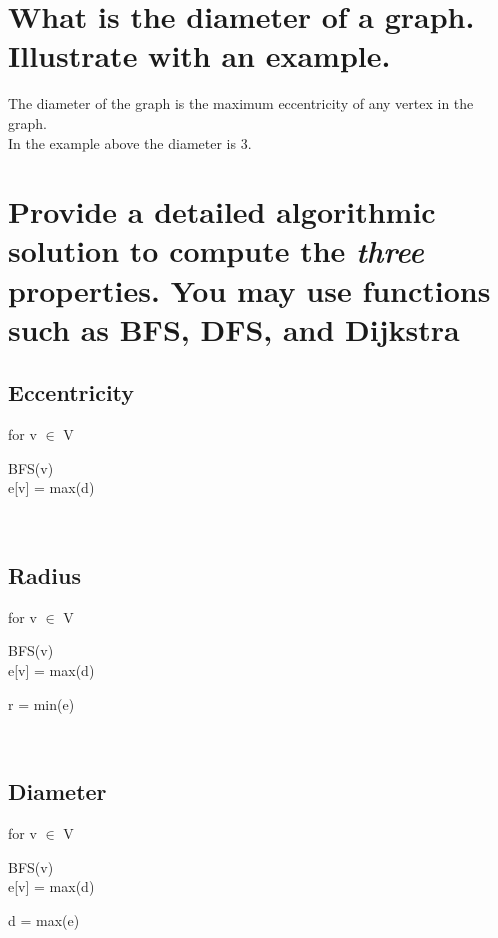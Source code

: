 \documentclass[titlepage]{article}
\begin{document}
  \section{What is the diameter of a graph. Illustrate with an example.}

    The diameter of the graph is the maximum eccentricity of any vertex in the graph.\\
    In the example above the diameter is 3.

  \section{Provide a detailed algorithmic solution to compute the \emph{three} properties. You may use functions such as BFS, DFS, and Dijkstra}

    \begin{minipage}[t]{0.3\linewidth}
      \subsection{Eccentricity}
        \begin{adjustwidth}{2em}{0pt}
          for v $\in$ V
          \begin{adjustwidth}{1em}{0pt}
            BFS(v) \\
            e[v] = max(d)
          \end{adjustwidth}
        \end{adjustwidth}
    \end{minipage}
\
    \begin{minipage}[t]{0.3\linewidth}
      \subsection{Radius}
        \begin{adjustwidth}{2em}{0pt}
          for v $\in$ V
          \begin{adjustwidth}{1em}{0pt}
            BFS(v) \\
            e[v] = max(d)
          \end{adjustwidth}
          r = min(e)
        \end{adjustwidth}
    \end{minipage}
\
    \begin{minipage}[t]{0.3\linewidth}
      \subsection{Diameter}
        \begin{adjustwidth}{2em}{0pt}
          for v $\in$ V
          \begin{adjustwidth}{1em}{0pt}
            BFS(v) \\
            e[v] = max(d)
          \end{adjustwidth}
          d = max(e)
        \end{adjustwidth}
    \end{minipage}
\end{document}
